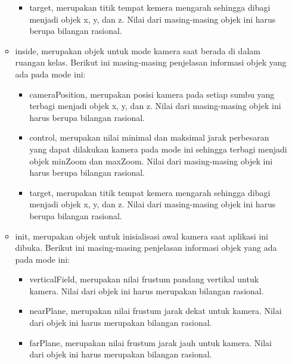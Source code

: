 \begin{itemize}
\begin{itemize}
\begin{itemize}
				\item target, merupakan titik tempat kemera mengarah sehingga dibagi menjadi objek x, y, dan z. Nilai dari masing-masing objek ini harus berupa bilangan rasional.
			\end{itemize}
			\item inside, merupakan objek untuk mode kamera saat berada di dalam ruangan kelas. Berikut ini masing-masing penjelasan informasi objek yang ada pada mode ini:
			\begin{itemize}
				\item cameraPosition, merupakan posisi kamera pada setiap sumbu yang terbagi menjadi objek x, y, dan z. Nilai dari masing-masing objek ini harus berupa bilangan rasional.
				\item control, merupakan nilai minimal dan maksimal jarak perbesaran yang dapat dilakukan kamera pada mode ini sehingga terbagi menjadi objek minZoom dan maxZoom. Nilai dari masing-masing objek ini harus berupa bilangan rasional.
				\item target, merupakan titik tempat kemera mengarah sehingga dibagi menjadi objek x, y, dan z. Nilai dari masing-masing objek ini harus berupa bilangan rasional.
			\end{itemize}
			\item init, merupakan objek untuk inisialisasi awal kamera saat aplikasi ini dibuka. Berikut ini masing-masing penjelasan informasi objek yang ada pada mode ini:
			\begin{itemize}
				\item verticalField, merupakan nilai frustum pandang vertikal untuk kamera. Nilai dari objek ini harus merupakan bilangan rasional.
				\item nearPlane, merupakan nilai frustum jarak dekat untuk kamera. Nilai dari objek ini harus merupakan bilangan rasional.
				\item farPlane, merupakan nilai frustum jarak jauh untuk kamera. Nilai dari objek ini harus merupakan bilangan rasional.
			\end{itemize}
		\end{itemize}
\end{itemize}


